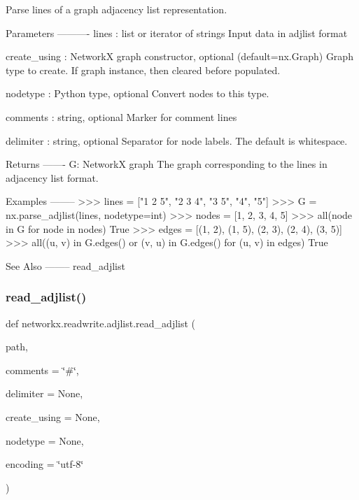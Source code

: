 \begin{DoxyVerb}Parse lines of a graph adjacency list representation.

Parameters
----------
lines : list or iterator of strings
    Input data in adjlist format

create_using : NetworkX graph constructor, optional (default=nx.Graph)
   Graph type to create. If graph instance, then cleared before populated.

nodetype : Python type, optional
   Convert nodes to this type.

comments : string, optional
   Marker for comment lines

delimiter : string, optional
   Separator for node labels.  The default is whitespace.

Returns
-------
G: NetworkX graph
    The graph corresponding to the lines in adjacency list format.

Examples
--------
>>> lines = ["1 2 5", "2 3 4", "3 5", "4", "5"]
>>> G = nx.parse_adjlist(lines, nodetype=int)
>>> nodes = [1, 2, 3, 4, 5]
>>> all(node in G for node in nodes)
True
>>> edges = [(1, 2), (1, 5), (2, 3), (2, 4), (3, 5)]
>>> all((u, v) in G.edges() or (v, u) in G.edges() for (u, v) in edges)
True

See Also
--------
read_adjlist\end{DoxyVerb}
 \mbox{\label{namespacenetworkx_1_1readwrite_1_1adjlist_a91901f189945f9fd9ea8d435440079ce}} 
\subsubsection{\texorpdfstring{read\+\_\+adjlist()}{read\_adjlist()}}
{\footnotesize\ttfamily def networkx.\+readwrite.\+adjlist.\+read\+\_\+adjlist (\begin{DoxyParamCaption}\item[{}]{path,  }\item[{}]{comments = {\ttfamily \char`\"{}\#\char`\"{}},  }\item[{}]{delimiter = {\ttfamily None},  }\item[{}]{create\+\_\+using = {\ttfamily None},  }\item[{}]{nodetype = {\ttfamily None},  }\item[{}]{encoding = {\ttfamily \char`\"{}utf-\/8\char`\"{}} }\end{DoxyParamCaption})}

